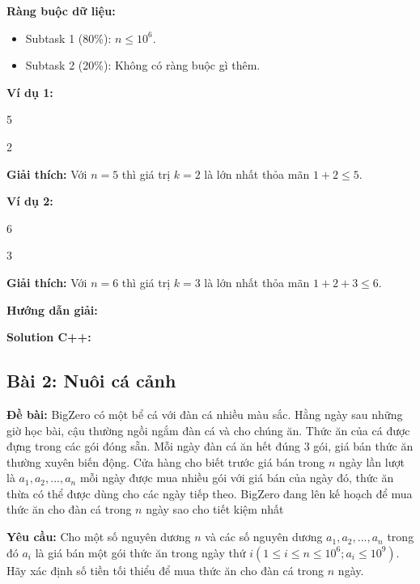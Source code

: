 \documentclass[12pt]{scrartcl}  %
\begin{document}
\textbf{Ràng buộc dữ liệu:}
\begin{itemize}
    \item Subtask 1 (80\%): $n \leq 10^6$.
    \item Subtask 2 (20\%): Không có ràng buộc gì thêm.
\end{itemize}

\textbf{Ví dụ 1:}
\begin{tcolorbox}[colback=gray!5!white, colframe=blue!50!black, title=Input]
5
\end{tcolorbox}
\begin{tcolorbox}[colback=gray!5!white, colframe=green!50!black, title=Output]
2
\end{tcolorbox}

\textbf{Giải thích:}
Với $n = 5$ thì giá trị $k = 2$ là lớn nhất thỏa mãn $1 + 2 \leq 5$.

\textbf{Ví dụ 2:}
\begin{tcolorbox}[colback=gray!5!white, colframe=blue!50!black, title=Input]
6
\end{tcolorbox}
\begin{tcolorbox}[colback=gray!5!white, colframe=green!50!black, title=Output]
3
\end{tcolorbox}

\textbf{Giải thích:}
Với $n = 6$ thì giá trị $k = 3$ là lớn nhất thỏa mãn $1 + 2 + 3 \leq 6$.

\textbf{Hướng dẫn giải:}

\textbf{Solution C++:}

\subsection{Bài 2: Nuôi cá cảnh}
\textbf{Đề bài:}
BigZero có một bể cá với đàn cá nhiều màu sắc. Hằng ngày sau những giờ học bài, cậu thường ngồi 
ngắm đàn cá và cho chúng ăn. Thức ăn của cá được đựng trong các gói đóng sẵn. Mỗi ngày đàn cá ăn hết đúng $3$ gói, giá bán thức ăn thường xuyên 
biến động. Cửa hàng cho biết trước giá bán trong $n$ ngày lần lượt là $a_1, a_2, ..., a_n$ mỗi ngày được mua nhiều gói với giá bán của ngày đó, thức ăn 
thừa có thể được dùng cho các ngày tiếp theo. BigZero đang lên kế hoạch để mua thức ăn cho đàn cá trong $n$ ngày sao cho tiết kiệm nhất 

\textbf{Yêu cầu:}
Cho một số nguyên dương $n$ và các số nguyên dương $a_1, a_2, ..., a_n$ trong đó $a_i$ là giá bán một gói thức ăn trong ngày thứ $i (1 \leq i \leq n \leq 10^6; a_i \leq 10^9)$. Hãy xác định số tiền tối thiểu để mua thức ăn cho đàn cá trong $n$ ngày. 
\end{document}
